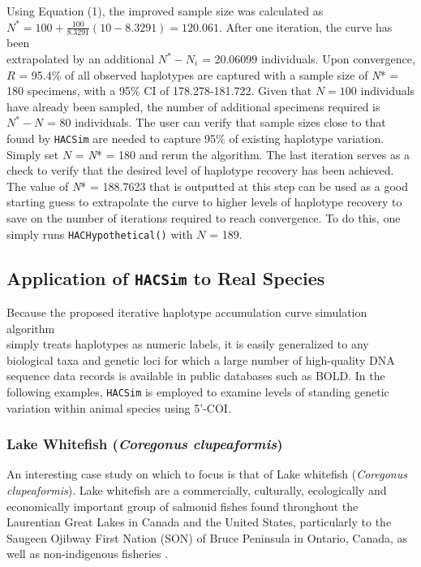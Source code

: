 Using Equation (1), the improved sample size was calculated as \\ $N^* = 100 + \frac{100}{8.3291}\left(10 - 8.3291\right) = 120.061$. After one iteration, the curve has been \\ extrapolated by an additional $N^*-N_i$ = 20.06099 individuals. Upon convergence, $R$ = 95.4\% of all observed haplotypes are captured with a sample size of \textit{N}* = 180 specimens, with a 95\% CI of 178.278-181.722. Given that $N = 100$ individuals have already been sampled, the number of additional specimens required is $N^*-N$ = 80 individuals.  The user can verify that sample sizes close to that found by {\tt HACSim} are needed to capture 95\% of existing haplotype variation. Simply set $N$ = \textit{N}* = 180 and rerun the algorithm. The last iteration serves as a check to verify that the desired level of haplotype recovery has been achieved. The value of \textit{N}* = 188.7623 that is outputted at this step can be used as a good starting guess to extrapolate the curve to higher levels of haplotype recovery to save on the number of iterations required to reach convergence. To do this, one simply runs {\tt HACHypothetical()} with $N$ = 189.


\subsection{Application of {\tt HACSim} to Real Species}

Because the proposed iterative haplotype accumulation curve simulation algorithm \\ simply treats haplotypes as numeric labels, it is easily generalized to any biological taxa and genetic loci for which a large number of high-quality DNA sequence data records is available in public databases such as BOLD. In the following examples, {\tt HACSim} is employed to examine levels of standing genetic variation within animal species using 5'-COI.

\subsubsection{Lake Whitefish (\textit{Coregonus clupeaformis})}

An interesting case study on which to focus is that of Lake whitefish (\textit{Coregonus \\ clupeaformis}). Lake whitefish are a commercially, culturally, ecologically and \\ economically important group of salmonid fishes found throughout the Laurentian Great Lakes in Canada and the United States, particularly to the Saugeen Ojibway First Nation (SON) of Bruce Peninsula in Ontario, Canada, as well as non-indigenous fisheries \cite{ryan2014distribution}.


